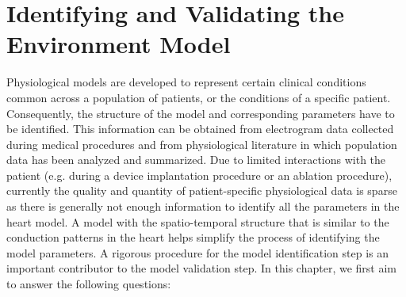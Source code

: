 \chapter{Identifying and Validating the Environment Model }

Physiological models are developed to represent certain clinical conditions common across a population of patients, or the conditions of a specific patient. Consequently, the structure of the model and corresponding parameters have to be identified. This information can be obtained from electrogram data collected during medical procedures and from physiological literature in which population data has been analyzed and summarized. Due to limited interactions with the patient (e.g. during a device implantation procedure or an ablation procedure), currently the quality and quantity of patient-specific physiological data is sparse as there is generally not enough information to identify all the parameters in the heart model.  A model with the spatio-temporal structure that is similar to the conduction patterns in the heart helps simplify the process of identifying the model parameters. A rigorous procedure for the model identification step is an important contributor to the model validation step. In this chapter, we first aim to answer the following questions:

